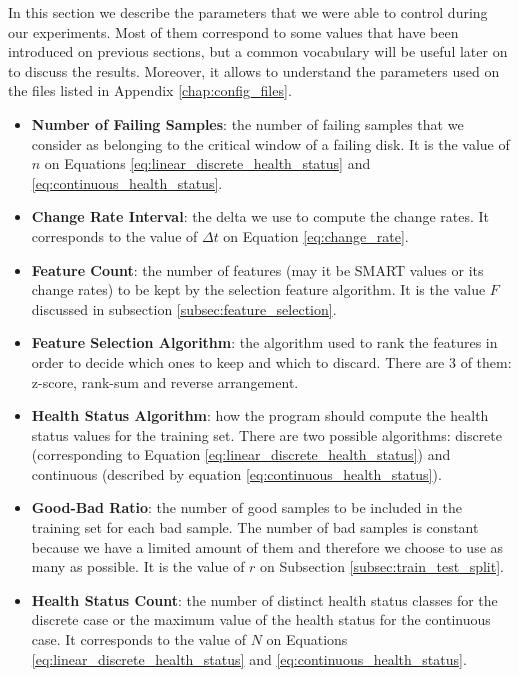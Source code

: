 In this section we describe the parameters that we were able to control during our experiments.
Most of them correspond to some values that have been introduced on previous sections, but a common vocabulary will be useful later on to discuss the results.
Moreover, it allows to understand the parameters used on the files listed in Appendix \ref{chap:config_files}.

\begin{itemize}
  \item \textbf{Number of Failing Samples}: the number of failing samples that we consider as belonging to the critical window of a failing disk. 
  It is the value of $n$ on Equations \ref{eq:linear_discrete_health_status} and \ref{eq:continuous_health_status}.

  \item \textbf{Change Rate Interval}: the delta we use to compute the change rates.
  It corresponds to the value of $\Delta t$ on Equation \ref{eq:change_rate}.

  \item \textbf{Feature Count}: the number of features (may it be SMART values or its change rates) to be kept by the selection feature algorithm.
  It is the value $F$ discussed in subsection \ref{subsec:feature_selection}.

  \item \textbf{Feature Selection Algorithm}: the algorithm used to rank the features in order to decide which ones to keep and which to discard.
  There are 3 of them: z-score, rank-sum and reverse arrangement.

  \item \textbf{Health Status Algorithm}: how the program should compute the health status values for the training set.
  There are two possible algorithms: discrete (corresponding to Equation \ref{eq:linear_discrete_health_status}) and continuous (described by equation \ref{eq:continuous_health_status}).
  
  \item \textbf{Good-Bad Ratio}: the number of good samples to be included in the training set for each bad sample.
  The number of bad samples is constant because we have a limited amount of them and therefore we choose to use as many as possible.
  It is the value of $r$ on Subsection \ref{subsec:train_test_split}.

  \item \textbf{Health Status Count}: the number of distinct health status classes for the discrete case or the maximum value of the health status for the continuous case.
  It corresponds to the value of $N$ on Equations \ref{eq:linear_discrete_health_status} and \ref{eq:continuous_health_status}.


\end{itemize}
